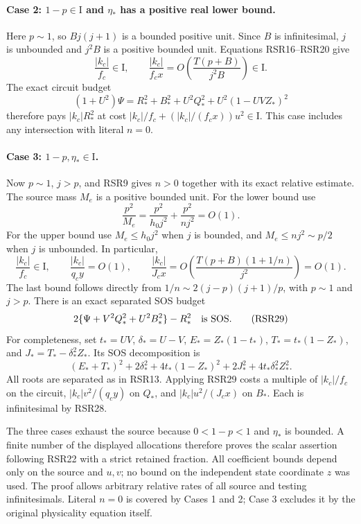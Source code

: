 \paragraph{Case 2: $1-p\in\mathrm I$ and $\eta_*$ has a positive real
lower bound.}
Here $p\sim1$, so $Bj(j+1)$ is a bounded positive unit. Since $B$ is
infinitesimal, $j$ is unbounded and $j^2B$ is a positive bounded unit.
Equations RSR16--RSR20 give
\[
 \frac{|k_c|}{f_c}\in\mathrm I,\qquad
 \frac{|k_c|}{f_cx}
 =O\!\left(\frac{T(p+B)}{j^2B}\right)\in\mathrm I.
 \tag{RSR26}
\]
The exact circuit budget
\[
 (1+U^2)\Psi=R_*^2+B_*^2+U^2Q_*^2+U^2(1-UVZ_*)^2
 \tag{RSR27}
\]
therefore pays $|k_c|R_*^2$ at cost
$|k_c|/f_c+(|k_c|/(f_cx))u^2\in\mathrm I$.
This case includes any intersection with literal $n=0$.

\paragraph{Case 3: $1-p,\eta_*\in\mathrm I$.}
Now $p\sim1$, $j>p$, and RSR9 gives $n>0$ together with its exact
relative estimate. The source mass $M_e$ is a positive bounded unit.
For the lower bound use
\[
 \frac{p^2}{M_e}
 =\frac{p^2}{h_0j^2}+\frac{p^2}{nj^2}=O(1).
\]
For the upper bound use $M_e\leq h_0j^2$ when $j$ is bounded,
and $M_e\leq nj^2\sim p/2$ when $j$ is unbounded. In particular,
\[
 \frac{|k_c|}{f_c}\in\mathrm I,\qquad
 \frac{|k_c|}{q_cy}=O(1),\qquad
 \frac{|k_c|}{J_cx}
 =O\!\left(\frac{T(p+B)(1+1/n)}{j^2}\right)=O(1).
 \tag{RSR28}
\]
The last bound follows directly from
$1/n\sim2(j-p)(j+1)/p$, with $p\sim1$ and $j>p$.
There is an exact separated SOS budget
\[
 2\{\Psi+V^2Q_*^2+U^2B_*^2\}-R_*^2\quad\hbox{is SOS}.
 \tag{RSR29}
\]
For completeness, set $t_*=UV$, $\delta_*=U-V$,
$E_*=Z_*(1-t_*)$, $T_*=t_*(1-Z_*)$, and
$J_*=T_*-\delta_*^2Z_*$. Its SOS decomposition is
\[
 (E_*+T_*)^2+2\delta_*^2+4t_*(1-Z_*)^2
                       +2J_*^2+4t_*\delta_*^2Z_*^2.
\]
All roots are separated as in RSR13. Applying RSR29 costs a multiple
of $|k_c|/f_c$ on the circuit, $|k_c|v^2/(q_cy)$ on $Q_*$,
and $|k_c|u^2/(J_cx)$ on $B_*$. Each is infinitesimal by RSR28.

The three cases exhaust the source because $0<1-p<1$ and $\eta_*$
is bounded. A finite number of the displayed allocations therefore
proves the scalar assertion following RSR22 with a strict retained
fraction. All coefficient bounds depend only on the source and
$u,v$; no bound on the independent state coordinate $z$ was used.
The proof allows arbitrary relative rates of all source and testing
infinitesimals. Literal $n=0$ is covered by Cases 1 and 2; Case 3
excludes it by the original physicality equation itself.


